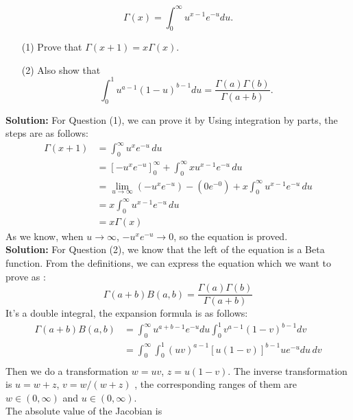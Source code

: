 \documentclass[a4paper]{article}
\begin{document}
\begin{equation}
\Gamma (x) = \int^{\infty}_{0}{u^{x-1}e^{-u}du.}
\end{equation}

\begin{enumerate}
\item[(1)] Prove that $\Gamma (x + 1) =x \Gamma (x)$.
\item[(2)] Also show that 
            \begin{equation}
            \int^{1}_{0}{u^{a-1}{(1-u)}^{b-1}du=\frac{\Gamma(a)\Gamma(b)}{\Gamma (a+b)}.}
            \end{equation}
\end{enumerate}


\textbf{Solution:} For Question (1), we can prove it by Using integration by parts, the steps are as follows:
\begin{equation}
    \begin{aligned}
        \Gamma(x+1) &= \int_0^\infty u^{x} e^{-u}\,du \\
                    &= \left[-u^x e^{-u}\right]_0^\infty + \int_0^\infty x u^{x-1} e^{-u}\, du \\
                    &= \lim_{u\to \infty}(-u^x e^{-u}) - (0 e^{-0}) + x\int_0^\infty u^{x-1} e^{-u}\, du \\
                    &= x\int_0^\infty u^{x-1} e^{-u}\, du\\
                    &= x\Gamma(x)
    \end{aligned}
\end{equation}
As we know, when $u\to \infty$, $-u^x e^{-u}\to 0$, so the equation is proved.\\



\textbf{Solution:} For Question (2), we know that the left of the equation is a Beta function. From the definitions, we can express the equation which we want to prove as : 
\begin{equation}
    \Gamma(a + b) B(a, b)= \frac{\Gamma(a)\Gamma(b)}{\Gamma (a+b)}
\end{equation}
It's a double integral, the expansion formula is as follows:
\begin{equation}
    \begin{aligned}
        \Gamma(a + b) B(a, b)   &= \int_0^\infty u^{a + b -1} e^{-u} du \int_0^1 v^{a-1} (1 - v)^{b-1} dv \\
                                &= \int_0^\infty \int_0^1 (u v)^{a-1}[u (1 - v)]^{b-1} u e^{-u} du \, dv \\
    \end{aligned}
\end{equation}
Then we do a transformation $w = u v$, $z = u (1 - v)$. The inverse transformation is $  u= w + z $, $ v = w \big/(w + z) $ ,  the corresponding ranges of them are $w \in (0, \infty)$ and $u \in (0, \infty)$. \\
The absolute value of the Jacobian is 
\end{document}
